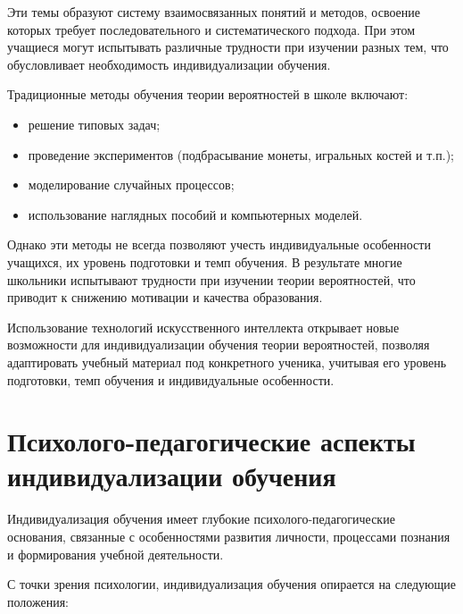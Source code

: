 \documentclass[a4paper,14pt]{extreport}
\begin{document}
Эти темы образуют систему взаимосвязанных понятий и методов, освоение которых требует последовательного и систематического подхода. При этом учащиеся могут испытывать различные трудности при изучении разных тем, что обусловливает необходимость индивидуализации обучения.

Традиционные методы обучения теории вероятностей в школе включают:
\begin{itemize}
    \item решение типовых задач;
    \item проведение экспериментов (подбрасывание монеты, игральных костей и т.п.);
    \item моделирование случайных процессов;
    \item использование наглядных пособий и компьютерных моделей.
\end{itemize}

Однако эти методы не всегда позволяют учесть индивидуальные особенности учащихся, их уровень подготовки и темп обучения. В результате многие школьники испытывают трудности при изучении теории вероятностей, что приводит к снижению мотивации и качества образования.

Использование технологий искусственного интеллекта открывает новые возможности для индивидуализации обучения теории вероятностей, позволяя адаптировать учебный материал под конкретного ученика, учитывая его уровень подготовки, темп обучения и индивидуальные особенности.

\section{Психолого-педагогические аспекты индивидуализации обучения}

Индивидуализация обучения имеет глубокие психолого-педагогические основания, связанные с особенностями развития личности, процессами познания и формирования учебной деятельности.

С точки зрения психологии, индивидуализация обучения опирается на следующие положения:
\end{document}
